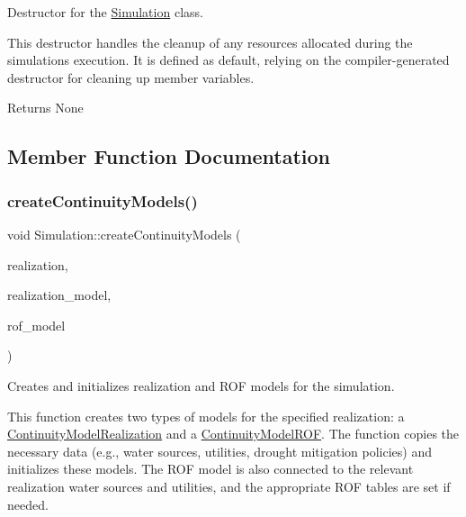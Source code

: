 Destructor for the \mbox{\hyperlink{classSimulation}{Simulation}} class. 

This destructor handles the cleanup of any resources allocated during the simulation\textquotesingle{}s execution. It is defined as default, relying on the compiler-\/generated destructor for cleaning up member variables.

\begin{DoxyReturn}{Returns}
None 
\end{DoxyReturn}


\subsection{Member Function Documentation}
\mbox{\label{classSimulation_aa2e2863a0038345c46dd827b97008347}} 
\subsubsection{\texorpdfstring{create\+Continuity\+Models()}{createContinuityModels()}}
{\footnotesize\ttfamily void Simulation\+::create\+Continuity\+Models (\begin{DoxyParamCaption}\item[{unsigned long}]{realization,  }\item[{\mbox{\hyperlink{classContinuityModelRealization}{Continuity\+Model\+Realization}} $\ast$\&}]{realization\+\_\+model,  }\item[{\mbox{\hyperlink{classContinuityModelROF}{Continuity\+Model\+R\+OF}} $\ast$\&}]{rof\+\_\+model }\end{DoxyParamCaption})}



Creates and initializes realization and R\+OF models for the simulation. 

This function creates two types of models for the specified realization\+: a {\ttfamily \mbox{\hyperlink{classContinuityModelRealization}{Continuity\+Model\+Realization}}} and a {\ttfamily \mbox{\hyperlink{classContinuityModelROF}{Continuity\+Model\+R\+OF}}}. The function copies the necessary data (e.\+g., water sources, utilities, drought mitigation policies) and initializes these models. The R\+OF model is also connected to the relevant realization water sources and utilities, and the appropriate R\+OF tables are set if needed.


